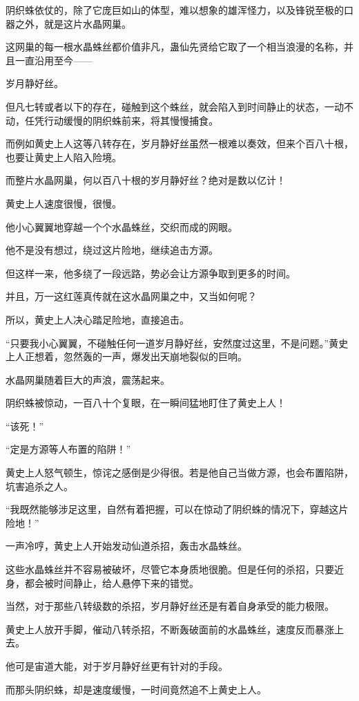 \begin{this_body}
阴织蛛依仗的，除了它庞巨如山的体型，难以想象的雄浑怪力，以及锋锐至极的口器之外，就是这片水晶网巢。

这网巢的每一根水晶蛛丝都价值非凡，蛊仙先贤给它取了一个相当浪漫的名称，并且一直沿用至今——

岁月静好丝。

但凡七转或者以下的存在，碰触到这个蛛丝，就会陷入到时间静止的状态，一动不动，任凭行动缓慢的阴织蛛前来，将其慢慢捕食。

而例如黄史上人这等八转存在，岁月静好丝虽然一根难以奏效，但来个百八十根，也要让黄史上人陷入险境。

而整片水晶网巢，何以百八十根的岁月静好丝？绝对是数以亿计！

黄史上人速度很慢，很慢。

他小心翼翼地穿越一个个水晶蛛丝，交织而成的网眼。

他不是没有想过，绕过这片险地，继续追击方源。

但这样一来，他多绕了一段远路，势必会让方源争取到更多的时间。

并且，万一这红莲真传就在这水晶网巢之中，又当如何呢？

所以，黄史上人决心踏足险地，直接追击。

“只要我小心翼翼，不碰触任何一道岁月静好丝，安然度过这里，不是问题。”黄史上人正想着，忽然轰的一声，爆发出天崩地裂似的巨响。

水晶网巢随着巨大的声浪，震荡起来。

阴织蛛被惊动，一百八十个复眼，在一瞬间猛地盯住了黄史上人！

“该死！”

“定是方源等人布置的陷阱！”

黄史上人怒气顿生，惊诧之感倒是少得很。若是他自己当做方源，也会布置陷阱，坑害追杀之人。

“我既然能够涉足这里，自然有着把握，可以在惊动了阴织蛛的情况下，穿越这片险地！”

一声冷哼，黄史上人开始发动仙道杀招，轰击水晶蛛丝。

这些水晶蛛丝并不容易被破坏，尽管它本身质地很脆。但是任何的杀招，只要近身，都会被时间静止，给人悬停下来的错觉。

当然，对于那些八转级数的杀招，岁月静好丝还是有着自身承受的能力极限。

黄史上人放开手脚，催动八转杀招，不断轰破面前的水晶蛛丝，速度反而暴涨上去。

他可是宙道大能，对于岁月静好丝更有针对的手段。

而那头阴织蛛，却是速度缓慢，一时间竟然追不上黄史上人。


\end{this_body}
